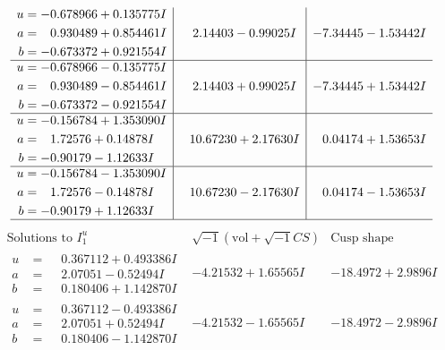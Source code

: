 \documentclass[1p]{elsarticle_modified}
\theoremstyle{definition}
\newcommand{\I}{\sqrt{-1}}
\begin{document}
$$\begin{array}{c|c|c}
\begin{aligned}
u &= -0.678966 + 0.135775 I \\
a &= \phantom{-}0.930489 + 0.854461 I \\
b &= -0.673372 + 0.921554 I\end{aligned}
 & \phantom{-}2.14403 - 0.99025 I & -7.34445 - 1.53442 I \\ \hline\begin{aligned}
u &= -0.678966 - 0.135775 I \\
a &= \phantom{-}0.930489 - 0.854461 I \\
b &= -0.673372 - 0.921554 I\end{aligned}
 & \phantom{-}2.14403 + 0.99025 I & -7.34445 + 1.53442 I \\ \hline\begin{aligned}
u &= -0.156784 + 1.353090 I \\
a &= \phantom{-}1.72576 + 0.14878 I \\
b &= -0.90179 - 1.12633 I\end{aligned}
 & \phantom{-}10.67230 + 2.17630 I & \phantom{-}0.04174 + 1.53653 I \\ \hline\begin{aligned}
u &= -0.156784 - 1.353090 I \\
a &= \phantom{-}1.72576 - 0.14878 I \\
b &= -0.90179 + 1.12633 I\end{aligned}
 & \phantom{-}10.67230 - 2.17630 I & \phantom{-}0.04174 - 1.53653 I\\
 \hline 
 \end{array}$$\newpage$$\begin{array}{c|c|c}  
\text{Solutions to }I^u_{1}& \I (\text{vol} + \sqrt{-1}CS) & \text{Cusp shape}\\
 \hline 
\begin{aligned}
u &= \phantom{-}0.367112 + 0.493386 I \\
a &= \phantom{-}2.07051 - 0.52494 I \\
b &= \phantom{-}0.180406 + 1.142870 I\end{aligned}
 & -4.21532 + 1.65565 I & -18.4972 + 2.9896 I \\ \hline\begin{aligned}
u &= \phantom{-}0.367112 - 0.493386 I \\
a &= \phantom{-}2.07051 + 0.52494 I \\
b &= \phantom{-}0.180406 - 1.142870 I\end{aligned}
 & -4.21532 - 1.65565 I & -18.4972 - 2.9896 I \\ \hline\begin{aligned}

\end{aligned}
\end{array}$$
\end{document}
